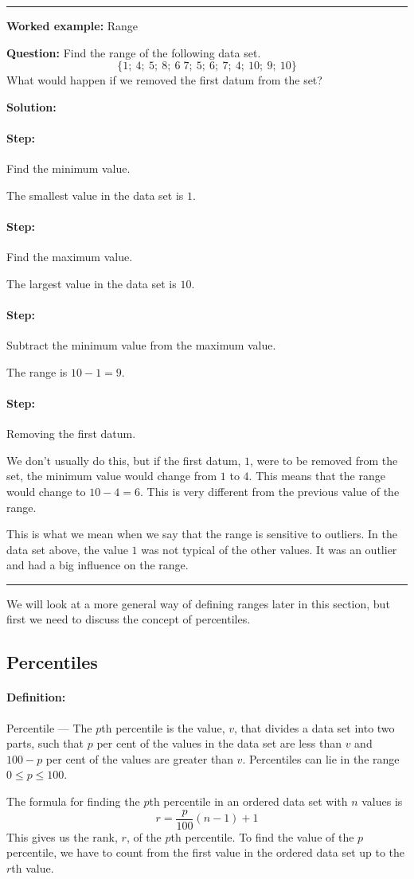 \documentclass[a4paper,11pt]{report}
\def\Definition#1#2{\paragraph{Definition:} #1 --- #2}
\newenvironment{wex}[3]%
{\rule{\linewidth}{0.5mm}
\textbf{Worked example:} #1

\textbf{Question:} #2

\textbf{Solution:} #3}%
{\rule{\linewidth}{0.5mm}}
\newcommand{\westep}[1]{\paragraph{Step:} #1}
\begin{document}
\begin{wex}{Range}{
    Find the range of the following data set.
    \begin{equation}
      \{1;\ 4;\ 5;\ 8;\ 6\; 7;\ 5;\ 6;\ 7;\ 4;\ 10;\ 9;\ 10\}
    \end{equation}
    What would happen if we removed the first datum from the set?
}{
  \westep{Find the minimum value.}

  The smallest value in the data set is $1$.

  \westep{Find the maximum value.}

  The largest value in the data set is $10$.

  \westep{Subtract the minimum value from the maximum value.}

  The range is $10-1=9$.

  \westep{Removing the first datum.}

  We don't usually do this, but if the first datum, $1$, were to be
  removed from the set, the minimum value would change from $1$ to
  $4$. This means that the range would change to $10-4=6$. This is
  very different from the previous value of the range.

  This is what we mean when we say that the range is sensitive to
  outliers. In the data set above, the value $1$ was not typical of
  the other values. It was an outlier and had a big influence on the
  range.

}
\end{wex}

We will look at a more general way of defining ranges later in this
section, but first we need to discuss the concept of percentiles.

\subsection{Percentiles}

\Definition{Percentile}{The $p$th percentile is the value, $v$, that
  divides a data set into two parts, such that $p$ per cent of the
  values in the data set are less than $v$ and $100-p$ per cent of the
  values are greater than $v$. Percentiles can lie in the range $0 \le
  p \le 100$.}

The formula for finding the $p$th percentile in an ordered data set
with $n$ values is
\begin{equation}
  r = \frac{p}{100}\left(n-1\right)+1
\end{equation}
This gives us the rank, $r$, of the $p$th percentile. To find the
value of the $p$ percentile, we have to count from the first value in
the ordered data set up to the $r$th value.
\end{document}
